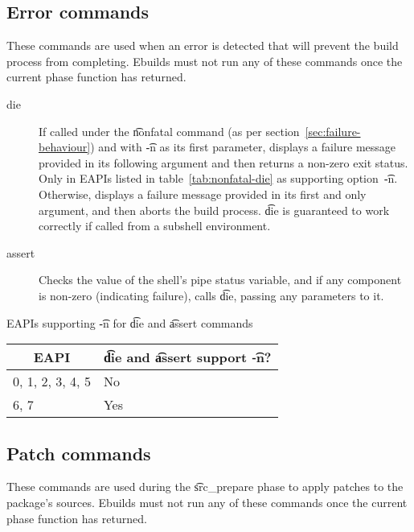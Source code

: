 \subsection{Error commands}
These commands are used when an error is detected that will prevent the build process from
completing. Ebuilds must not run any of these commands once the current phase function has returned.
\begin{description}
\item[die]  If called under the \t{nonfatal} command (as per
    section~\ref{sec:failure-behaviour}) and with \t{-n} as its first parameter, displays a failure
    message provided in its following argument and then returns a non-zero exit status. Only in
    EAPIs listed in table~\ref{tab:nonfatal-die} as supporting option~\t{-n}. Otherwise, displays
    a failure message provided in its first and only argument, and then aborts the build process.
    \t{die} is  guaranteed to work correctly if called from a subshell environment.
\item[assert] Checks the value of the shell's pipe status variable, and if any component is non-zero
    (indicating failure), calls \t{die}, passing any parameters to it.
\end{description}

\begin{centertable}{EAPIs supporting \t{-n} for \t{die} and \t{assert} commands}
    \label{tab:nonfatal-die}
    \begin{tabular}{ll}
      \toprule
      \multicolumn{1}{c}{\textbf{EAPI}} &
      \multicolumn{1}{c}{\textbf{\t{die} and \t{assert} support \t{-n}?}} \\
      \midrule
      0, 1, 2, 3, 4, 5  & No  \\
      6, 7              & Yes \\
      \bottomrule
    \end{tabular}
\end{centertable}

\subsection{Patch commands}
These commands are used during the \t{src_prepare} phase to apply patches to the package's sources.
Ebuilds must not run any of these commands once the current phase function has returned.

